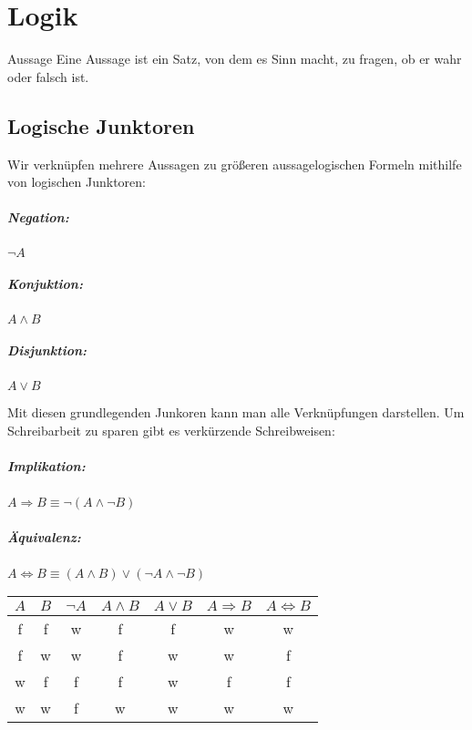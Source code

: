 \chapter{Logik}
\begin{definition}{Aussage}
	Eine Aussage ist ein Satz, von dem es Sinn macht, zu fragen, ob er wahr oder falsch ist.
\end{definition}

\section{Logische Junktoren}
Wir verknüpfen mehrere Aussagen zu größeren aussagelogischen Formeln mithilfe von logischen Junktoren:
  \paragraph{Negation:}
  $\neg A$

  \paragraph{Konjuktion:}
  $A \wedge B$

  \paragraph{Disjunktion:}
  $A \vee B$

	\par \medskip

Mit diesen grundlegenden Junkoren kann man alle Verknüpfungen darstellen. Um Schreibarbeit zu sparen gibt es verkürzende Schreibweisen:

\paragraph{Implikation:}
$A\Rightarrow B \equiv \neg(A\wedge \neg B)$
\paragraph{Äquivalenz:}
$A\Leftrightarrow B \equiv (A\wedge B)\vee (\neg A\wedge \neg B)$

\vspace{1em}
\begin{center}
	\renewcommand{\arraystretch}{1.2}
  \begin{tabular}{c c|c c c c c}
    $A$ & $B$ & $\neg A$ & $A \wedge B$ & $A \vee B$ & $A \Rightarrow B$ & $A \Leftrightarrow B$\\
    \hline  f & f & w & f & f & w & w \\
            f & w & w & f & w & w & f \\
            w & f & f & f & w & f & f \\
            w & w & f & w & w & w & w
  \end{tabular}
\end{center}



